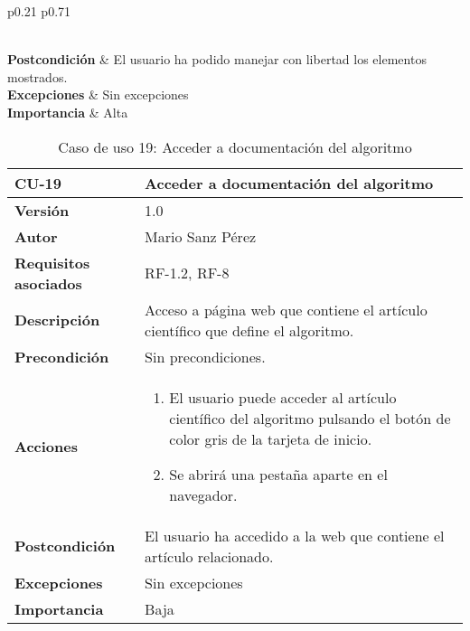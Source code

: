 \begin{table}[p]
\begin{tabularx}{\linewidth}{ p{0.21\columnwidth} p{0.71\columnwidth} }
\begin{enumerate}
		\end{enumerate}\\
		\textbf{Postcondición}        & El usuario ha podido manejar con libertad los elementos mostrados. \\
		\textbf{Excepciones}          & Sin excepciones \\
		\textbf{Importancia}          & Alta \\
		\bottomrule
	\end{tabularx}
	\caption{Caso de uso 5: Controlar visualizaciones (grafos).}
\end{table}


\begin{table}[p]
	\centering
	\begin{tabularx}{\linewidth}{ p{} p{} }
		\toprule
		\textbf{CU-19}    & \textbf{Acceder a documentación del algoritmo}\\
		\toprule
		\textbf{Versión}              & 1.0    \\
		\textbf{Autor}                & Mario Sanz Pérez \\
		\textbf{Requisitos asociados} & RF-1.2, RF-8 \\
		\textbf{Descripción}          & Acceso a página web que contiene el artículo científico que define el algoritmo. \\
		\textbf{Precondición}         & Sin precondiciones. \\
		\textbf{Acciones}             &
		\begin{enumerate}
			\def\labelenumi{\arabic{enumi}.}
			\tightlist
			\item El usuario puede acceder al artículo científico del algoritmo pulsando el botón de color gris de la tarjeta de inicio.
			\item Se abrirá una pestaña aparte en el navegador.
		\end{enumerate}\\
		\textbf{Postcondición}        & El usuario ha accedido a la web que contiene el artículo relacionado. \\
		\textbf{Excepciones}          & Sin excepciones \\
		\textbf{Importancia}          & Baja \\
		\bottomrule
	\end{tabularx}
	\caption{Caso de uso 19: Acceder a documentación del algoritmo}
\end{table}

